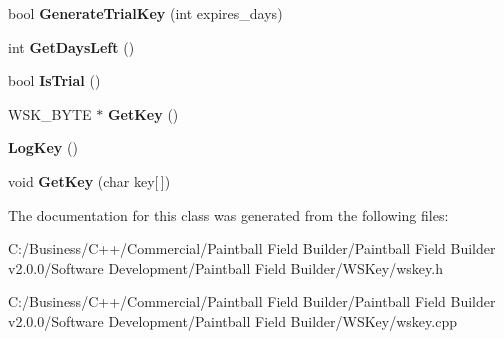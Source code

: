 \begin{DoxyCompactItemize}
\item 
\hypertarget{class_w_s_key_1_1_c_w_s_key_a2246e253d13c8c2760ef21da6fc0e2fa}{
bool {\bfseries GenerateTrialKey} (int expires\_\-days)}
\label{class_w_s_key_1_1_c_w_s_key_a2246e253d13c8c2760ef21da6fc0e2fa}

\item 
\hypertarget{class_w_s_key_1_1_c_w_s_key_a6db70e9f7bdf57a66d4ecc939cf3ec6e}{
int {\bfseries GetDaysLeft} ()}
\label{class_w_s_key_1_1_c_w_s_key_a6db70e9f7bdf57a66d4ecc939cf3ec6e}

\item 
\hypertarget{class_w_s_key_1_1_c_w_s_key_a1d08a1fae98cdfbfed027cd15b0ba0d8}{
bool {\bfseries IsTrial} ()}
\label{class_w_s_key_1_1_c_w_s_key_a1d08a1fae98cdfbfed027cd15b0ba0d8}

\item 
\hypertarget{class_w_s_key_1_1_c_w_s_key_ae4c1ac0bffca9d0092bd927fcc632658}{
WSK\_\-BYTE $\ast$ {\bfseries GetKey} ()}
\label{class_w_s_key_1_1_c_w_s_key_ae4c1ac0bffca9d0092bd927fcc632658}

\item 
\hypertarget{class_w_s_key_1_1_c_w_s_key_aa39cde2ce400ebb1532b8236d65f4d5c}{
{\bfseries LogKey} ()}
\label{class_w_s_key_1_1_c_w_s_key_aa39cde2ce400ebb1532b8236d65f4d5c}

\item 
\hypertarget{class_w_s_key_1_1_c_w_s_key_ad196a589ef1492c4c350ef75cf0997f8}{
void {\bfseries GetKey} (char key\mbox{[}$\,$\mbox{]})}
\label{class_w_s_key_1_1_c_w_s_key_ad196a589ef1492c4c350ef75cf0997f8}

\end{DoxyCompactItemize}


The documentation for this class was generated from the following files:\begin{DoxyCompactItemize}
\item 
C:/Business/C++/Commercial/Paintball Field Builder/Paintball Field Builder v2.0.0/Software Development/Paintball Field Builder/WSKey/wskey.h\item 
C:/Business/C++/Commercial/Paintball Field Builder/Paintball Field Builder v2.0.0/Software Development/Paintball Field Builder/WSKey/wskey.cpp\end{DoxyCompactItemize}
